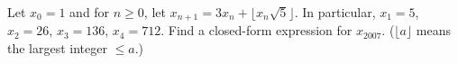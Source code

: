 Let $x_0 = 1$ and for $n \geq 0$, let $x_{n+1} = 3x_n + \lfloor x_n
\sqrt{5} \rfloor$. In particular, $x_1 = 5$, $x_2 = 26$, $x_3 = 136$,
$x_4 = 712$. Find a closed-form expression for $x_{2007}$. ($\lfloor a
\rfloor$ means the largest integer $\leq a$.)
